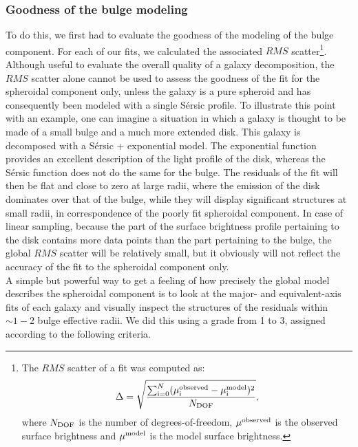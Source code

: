 \documentclass[preprint2]{emulateapj}
\begin{document}
\subsubsection{Goodness of the bulge modeling}
To do this, we first had to evaluate the goodness of the modeling of the bulge component.
For each of our fits, we calculated the associated $RMS$ scatter\footnote{The $RMS$ scatter of a fit was computed as:
\begin{equation}
\Delta = \sqrt{\frac{\sum_{\rm i=0}^{N} (\mu_{\rm i}^{\rm observed} - \mu_{\rm i}^{\rm model})^2}{N_{\rm DOF}} } ,
\end{equation} 
where %
$N_{\rm DOF}$ is the number of degrees-of-freedom, 
$\mu^{\rm observed}$ is the observed surface brightness 
and $\mu^{\rm model}$ is the model surface brightness.}.
Although useful to evaluate the overall quality of a galaxy decomposition, 
the $RMS$ scatter alone cannot be used to assess the goodness of the fit for the spheroidal component only, 
unless the galaxy is a pure spheroid and has consequently been modeled with a single S\'ersic profile.
To illustrate this point with an example, 
one can imagine a situation in which a galaxy is thought to be made of a small bulge and a much more extended disk.
This galaxy is decomposed with a S\'ersic + exponential model.
The exponential function provides an excellent description of the light profile of the disk, 
whereas the S\'ersic function does not do the same for the bulge.
The residuals of the fit will then be flat and close to zero at large radii, 
where the emission of the disk dominates over that of the bulge,
while they will display significant structures at small radii, 
in correspondence of the poorly fit spheroidal component.
In case of linear sampling, 
because the part of the surface brightness profile pertaining to the disk contains more data points 
than the part pertaining to the bulge, 
the global $RMS$ scatter will be relatively small, 
but it obviously will not reflect the accuracy of the fit to the spheroidal component only. \\
A simple but powerful way to get a feeling of how precisely the global model describes the spheroidal component 
is to look at the major- and equivalent-axis fits of each galaxy 
and visually inspect the structures of the residuals within $\sim 1 - 2$ bulge effective radii. 
We did this using a grade from 1 to 3, assigned according to the following criteria.
\end{document}
